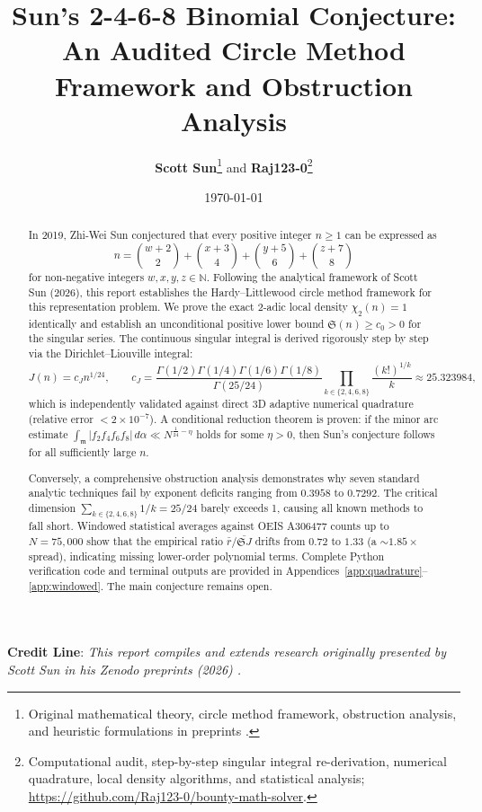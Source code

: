 \documentclass[11pt, a4paper]{article}
\title{\textbf{Sun's 2-4-6-8 Binomial Conjecture: An Audited Circle Method Framework and Obstruction Analysis}}
\author{\textbf{Scott Sun}\thanks{Original mathematical theory, circle method framework, obstruction analysis, and heuristic formulations in preprints \cite{scottsun2026v2, scottsun2026v3}.} \quad and \quad \textbf{Raj123-0}\thanks{Computational audit, step-by-step singular integral re-derivation, numerical quadrature, local density algorithms, and statistical analysis; \url{https://github.com/Raj123-0/bounty-math-solver}.}}
\date{\today}
\theoremstyle{plain}
\theoremstyle{definition}
\begin{document}
\maketitle

\begin{center}
\colorbox{yellow!15}{\parbox{0.95\textwidth}{
\footnotesize
\textbf{Credit Line}:
\emph{This report compiles and extends research originally presented by Scott Sun in his Zenodo preprints (2026) \cite{scottsun2026v2, scottsun2026v3}.}
}}
\end{center}
\vspace{0.5em}

\begin{abstract}
In 2019, Zhi-Wei Sun conjectured that every positive integer $n \geq 1$ can be expressed as
\[
n = \binom{w+2}{2} + \binom{x+3}{4} + \binom{y+5}{6} + \binom{z+7}{8}
\]
for non-negative integers $w,x,y,z \in \mathbb{N}$. Following the analytical framework of Scott Sun (2026), this report establishes the Hardy--Littlewood circle method framework for this representation problem. We prove the exact 2-adic local density $\chi_2(n)=1$ identically and establish an unconditional positive lower bound $\mathfrak{S}(n) \geq c_0 > 0$ for the singular series. The continuous singular integral is derived rigorously step by step via the Dirichlet--Liouville integral:
\[
J(n) = c_J n^{1/24}, \qquad 
c_J = \frac{\Gamma(1/2)\Gamma(1/4)\Gamma(1/6)\Gamma(1/8)}{\Gamma(25/24)} \prod_{k\in\{2,4,6,8\}} \frac{(k!)^{1/k}}{k} \approx 25.323984,
\]
which is independently validated against direct 3D adaptive numerical quadrature (relative error $< 2 \times 10^{-7}$). A conditional reduction theorem is proven: if the minor arc estimate $\int_{\mathfrak{m}} |f_2 f_4 f_6 f_8|\,d\alpha \ll N^{\frac{1}{24}-\eta}$ holds for some $\eta>0$, then Sun's conjecture follows for all sufficiently large $n$.

Conversely, a comprehensive obstruction analysis demonstrates why seven standard analytic techniques fail by exponent deficits ranging from $0.3958$ to $0.7292$. The critical dimension $\sum_{k\in\{2,4,6,8\}} 1/k = 25/24$ barely exceeds 1, causing all known methods to fall short. Windowed statistical averages against OEIS A306477 counts up to $N=75{,}000$ show that the empirical ratio $\bar{r}/\bar{\mathfrak{S}J}$ drifts from $0.72$ to $1.33$ (a $\sim 1.85\times$ spread), indicating missing lower-order polynomial terms. Complete Python verification code and terminal outputs are provided in Appendices~\ref{app:quadrature}--\ref{app:windowed}. The main conjecture remains open.
\end{abstract}
\end{document}
